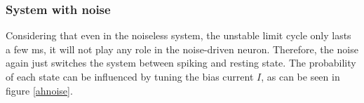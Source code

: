 \documentclass[12pt,a4paper]{article}
\begin{document}
\subsubsection{System with noise}
Considering that even in the noiseless system, the unstable limit cycle only lasts a few ms, it will not play any role in the noise-driven neuron. Therefore, the noise again just switches the system between spiking and resting state. The probability of each state can be influenced by tuning the bias current $I$, as can be seen in figure \ref{ahnoise}.
\begin{figure}[H]

\end{figure}
\end{document}
